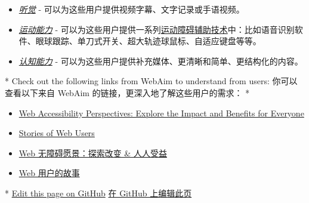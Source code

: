\begin{paracol}{2}
\begin{itemize}
\item
  \emph{\href{https://webaim.org/articles/auditory/}{听觉}} -
  可以为这些用户提供视频字幕、文字记录或手语视频。
\item
  \emph{\href{https://webaim.org/articles/motor/}{运动能力}} -
  可以为这些用户提供一系列\href{https://webaim.org/articles/motor/assistive}{运动障碍辅助技术}中：比如语音识别软件、眼球跟踪、单刀式开关、超大轨迹球鼠标、自适应键盘等等。
\item
  \emph{\href{https://webaim.org/articles/cognitive/}{认知能力}} -
  可以为这些用户提供补充媒体、更清晰和简单、更结构化的内容。
\end{itemize}
\switchcolumn[0]*%
Check out the following links from WebAim to understand from users:
\switchcolumn
你可以查看以下来自 WebAim 的链接，更深入地了解这些用户的需求：
\switchcolumn[0]*%
\begin{itemize}
\item
  \href{https://www.w3.org/WAI/perspective-videos/}{Web Accessibility
  Perspectives: Explore the Impact and Benefits for Everyone}
\item
  \href{https://www.w3.org/WAI/people-use-web/user-stories/}{Stories of
  Web Users}
\end{itemize}
\switchcolumn
\begin{itemize}
\item
  \href{https://www.w3.org/WAI/perspective-videos/}{Web
  无障碍愿景：探索改变 \& 人人受益}
\item
  \href{https://www.w3.org/WAI/people-use-web/user-stories/}{Web
  用户的故事}
\end{itemize}
\switchcolumn[0]*%
\href{https://github.com/vuejs/docs/edit/main/src/guide/best-practices/accessibility.md}{Edit
this page on GitHub}
\switchcolumn
\href{https://github.com/vuejs-translations/docs-zh-cn/edit/main/src/guide/best-practices/accessibility.md}{在
GitHub 上编辑此页}
\end{paracol}

